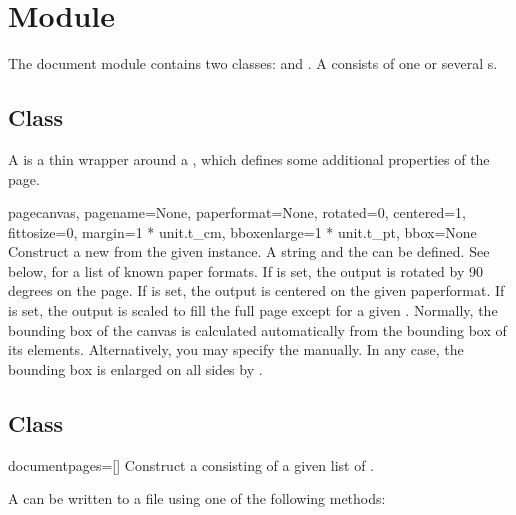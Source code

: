 \section{Module }
\label{document}





The document module contains two classes:  and
. A  consists of one or several
s.


\subsection{Class }

A  is a thin wrapper around a , which
defines some additional properties of the page.

\begin{classdesc}{page}{canvas, pagename=None,
    paperformat=None, rotated=0, centered=1, fittosize=0,
    margin=1 * unit.t_cm, bboxenlarge=1 * unit.t_pt, bbox=None}
  Construct a new  from the given  instance.
  A string  and the  can be
  defined. See below, for a list of known paper formats.
  If  is set, the output is rotated by 90 degrees on the
  page. If  is set, the output is centered on the given
  paperformat. If  is set, the output is scaled to fill
  the full page except for a given . 
  Normally, the bounding box of the canvas is calculated automatically
  from the bounding box of its elements.  Alternatively, you may
  specify the  manually. In any case, the bounding box is
  enlarged on all sides by .
\end{classdesc}

\subsection{Class }

\begin{classdesc}{document}{pages=[]}
    Construct a  consisting of a given list of .
\end{classdesc}

A  can be written to a file using one of the following methods:

